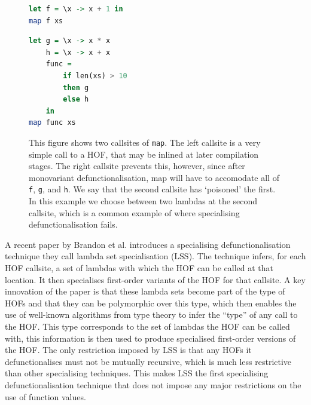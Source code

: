 \documentclass[a4paper,UKenglish,cleveref, autoref, thm-restate]{template/lipics-v2021}
\newcommand{\hof}{HOF\xspace}
\newcommand{\hofs}{HOFs\xspace}
\newcommand{\lss}{LSS\xspace}
\begin{document}
\begin{figure}
  \centering
  \begin{minipage}[t]{0.45\textwidth}
    \begin{lstlisting}[language=Haskell]
let f = \x -> x + 1 in
map f xs\end{lstlisting}
  \end{minipage}
  \hfill
  \begin{minipage}[t]{0.53\textwidth}
    \begin{lstlisting}[language=Haskell]
let g = \x -> x * x
    h = \x -> x + x
    func =
        if len(xs) > 10
        then g
        else h
    in
map func xs\end{lstlisting}
  \end{minipage}
  \caption{This figure shows two callsites of \texttt{map}. The left callsite is a very simple call to a \hof, that may be inlined at later compilation stages. The right callsite prevents this, however, since after monovariant defunctionalisation, map will have to accomodate all of \texttt{f}, \texttt{g}, and \texttt{h}. We say that the second callsite has `poisoned' the first. In this example we choose between two lambdas at the second callsite, which is a common example of where specialising defunctionalisation fails.}
  \label{fig:ex-poisoning}
\end{figure}

A recent paper by Brandon et al. \cite{brandon2023better} introduces a specialising defunctionalisation technique they call lambda set specialisation (\lss). The technique infers, for each \hof callsite, a set of lambdas with which the \hof can be called at that location. It then specialises first-order variants of the \hof for that callsite. A key innovation of the paper is that these lambda sets become part of the type of \hofs and that they can be polymorphic over this type, which then enables the use of well-known algorithms from type theory to infer the ``type'' of any call to the \hof. This type corresponds to the set of lambdas the \hof can be called with, this information is then used to produce specialised first-order versions of the \hof. The only restriction imposed by \lss is that any \hofs it defunctionalises must not be mutually recursive, which is much less restrictive than other specialising techniques. This makes \lss the first specialising defunctionalisation technique that does not impose any major restrictions on the use of function values.
\end{document}
